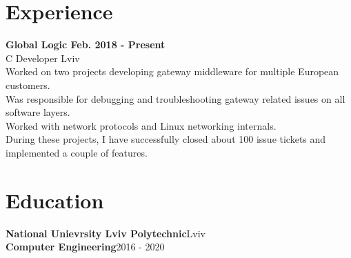 \documentclass{article}
\begin{document}
\section{Experience}
{\bfseries
Global Logic \hspace*{\fill}Feb. 2018 - Present\\
}
\vspace{0.5em}
C Developer  \hspace*{\fill}Lviv\\
Worked on two projects developing gateway middleware for multiple European customers.\\
Was responsible for debugging and troubleshooting gateway related issues on all software layers.\\
Worked with network protocols and Linux networking internals.\\
During these projects, I have successfully closed about 100 issue tickets and implemented a couple of features.\\


\section{Education}
\textbf{National Unievrsity Lviv Polytechnic}\hspace*{\fill}Lviv\\
\textbf{Computer Engineering}\hspace*{\fill}2016 - 2020
\end{document}
